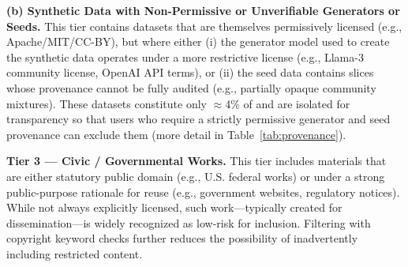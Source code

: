     \textbf{(b) Synthetic Data with Non-Permissive or Unverifiable Generators or Seeds.} This tier contains datasets that are themselves permissively licensed (e.g., Apache/MIT/CC-BY), but where either (i) the generator model used to create the synthetic data operates under a more restrictive license (e.g., Llama-3 community license, OpenAI API terms), or (ii) the seed data contains slices whose provenance cannot be fully audited (e.g., partially opaque community mixtures). These datasets constitute only $\approx$4\% of \MixtureVitae{} and are isolated for transparency so that users who require a strictly permissive generator and seed provenance can exclude them (more detail in Table~\ref{tab:provenance}). %

\textbf{Tier 3 --- Civic / Governmental Works.}  
This tier includes materials that are either statutory public domain (e.g., U.S. federal works) or under a strong public-purpose rationale for reuse (e.g., government websites, regulatory notices). While not always explicitly licensed, such work---typically created for dissemination---is widely recognized as low-risk for inclusion. Filtering with copyright keyword checks further reduces the possibility of inadvertently including restricted content.


